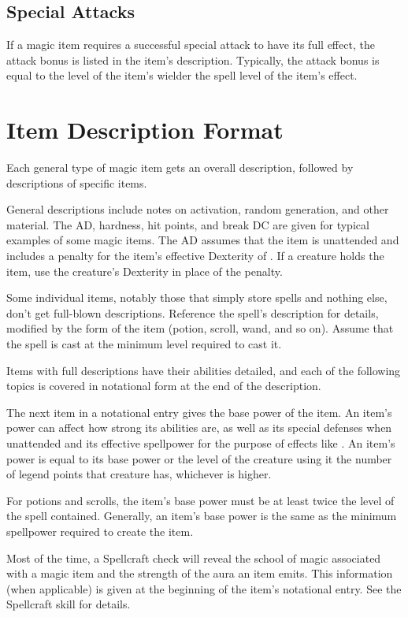 \subsection{Special Attacks}

If a magic item requires a successful special attack to have its full effect, the attack bonus is listed in the item's description.
Typically, the attack bonus is equal to the level of the item's wielder \add the spell level of the item's effect.

\section{Item Description Format}

Each general type of magic item gets an overall description, followed by descriptions of specific items.

General descriptions include notes on activation, random generation, and other material.
The AD, hardness, hit points, and break DC are given for typical examples of some magic items.
The AD assumes that the item is unattended and includes a  penalty for the item's effective Dexterity of .
If a creature holds the item, use the creature's Dexterity in place of the  penalty.

Some individual items, notably those that simply store spells and nothing else, don't get full-blown descriptions.
Reference the spell's description for details, modified by the form of the item (potion, scroll, wand, and so on).
Assume that the spell is cast at the minimum level required to cast it.

Items with full descriptions have their abilities detailed, and each of the following topics is covered in notational form at the end of the description.

 The next item in a notational entry gives the base power of the item.
An item's power can affect how strong its abilities are, as well as its special defenses when unattended and its effective spellpower for the purpose of effects like .
An item's power is equal to its base power or the level of the creature using it \add the number of legend points that creature has, whichever is higher.

For potions and scrolls, the item's base power must be at least twice the level of the spell contained.
Generally, an item's base power is the same as the minimum spellpower required to create the item.

 Most of the time, a Spellcraft check will reveal the school of magic associated with a magic item and the strength of the aura an item emits.
This information (when applicable) is given at the beginning of the item's notational entry.
See the Spellcraft skill for details.

